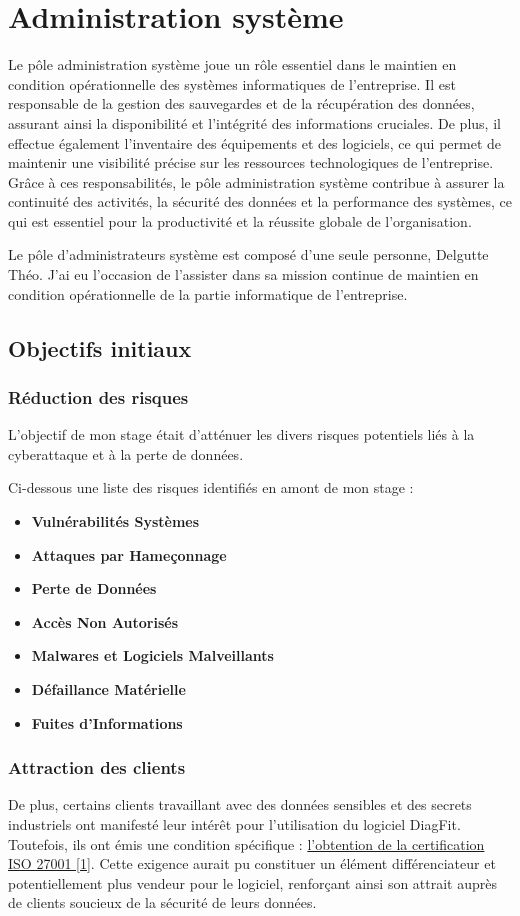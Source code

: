 \newpage
\section{Administration système}
Le pôle administration système joue un rôle essentiel dans le maintien en condition opérationnelle des systèmes informatiques de l'entreprise.
Il est responsable de la gestion des sauvegardes et de la récupération des données, assurant ainsi la disponibilité et l'intégrité des informations cruciales.
De plus, il effectue également l'inventaire des équipements et des logiciels, ce qui permet de maintenir une visibilité précise sur les ressources technologiques de l'entreprise.
Grâce à ces responsabilités, le pôle administration système contribue à assurer la continuité des activités, la sécurité des données et la performance des systèmes, ce qui est essentiel pour la productivité et la réussite globale de l'organisation.

Le pôle d'administrateurs système est composé d'une seule personne, Delgutte Théo.
J'ai eu l'occasion de l'assister dans sa mission continue de maintien en condition opérationnelle de la partie informatique de l'entreprise.

\subsection{Objectifs initiaux}
\subsubsection{Réduction des risques}
L'objectif de mon stage était d'atténuer les divers risques potentiels liés à la cyberattaque et à la perte de données.

Ci-dessous une liste des risques identifiés en amont de mon stage :
\begin{itemize}
    \item \textbf{Vulnérabilités Systèmes}
    \item \textbf{Attaques par Hameçonnage}
    \item \textbf{Perte de Données}
    \item \textbf{Accès Non Autorisés}
    \item \textbf{Malwares et Logiciels Malveillants}
    \item \textbf{Défaillance Matérielle}
    \item \textbf{Fuites d'Informations}
\end{itemize}

\subsubsection{Attraction des clients}
De plus, certains clients travaillant avec des données sensibles et des secrets industriels ont manifesté leur intérêt pour l'utilisation du logiciel DiagFit.
Toutefois, ils ont émis une condition spécifique : \hyperref[iso]{l'obtention de la certification ISO 27001 [1]}.
Cette exigence aurait pu constituer un élément différenciateur et potentiellement plus vendeur pour le logiciel, renforçant ainsi son attrait auprès de clients soucieux de la sécurité de leurs données.

